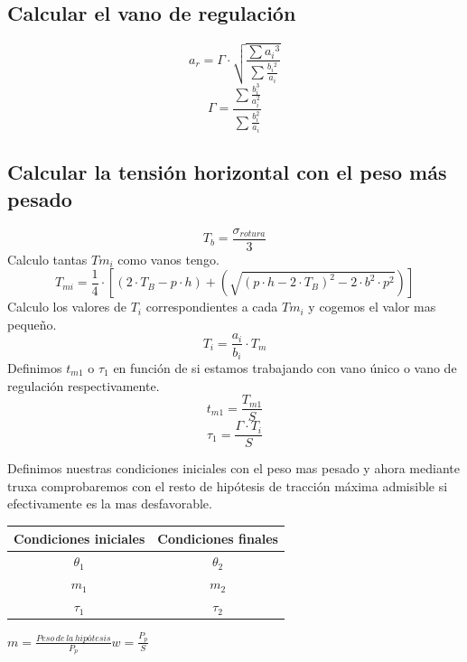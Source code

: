 \documentclass{article}
\begin{document}
\subsection{Calcular el vano de regulación}
$$a_{r}=\Gamma \cdot \sqrt{\frac{\sum a_{i}{ }^{3}}{\sum \frac{b_{i}{ }^{2}}{a_{i}}}}$$
$$\Gamma=\frac{\sum \frac{b_{i}^{3}}{a_{i}^{2}}}{\sum \frac{b_{i}^{2}}{a_{i}}}$$
\newpage
\subsection{Calcular la tensión horizontal con el peso más pesado}
$$T_b = \frac{\sigma_{rotura}}{3}$$
Calculo tantas $Tm_i$ como vanos tengo.
$$T_{m i}=\frac{1}{4} \cdot\left[\left(2 \cdot T_{B}-p \cdot h\right)+\left(\sqrt{\left(p \cdot h-2 \cdot T_{B}\right)^{2}-2 \cdot b^{2} \cdot p^{2}}\right)\right]$$
Calculo los valores de $T_i$ correspondientes a cada $Tm_i$ y cogemos el valor mas pequeño.
$$T_{i}=\frac{a_{i}}{b_{i}} \cdot T_{m}$$
Definimos $t_{m 1}$ o $\tau_1$ en función de si estamos trabajando con vano único o vano de regulación respectivamente.
$$t_{m 1}=\frac{T_{m 1}}{S}$$
$$\tau_{1}=\frac{\Gamma \cdot T_{i}}{S}$$

Definimos nuestras condiciones iniciales con el peso mas pesado y ahora mediante truxa comprobaremos con el resto de hipótesis de tracción máxima admisible si efectivamente es la mas desfavorable.
\begin{center}
\begin{tabular}{| c | c | }
\hline
Condiciones iniciales & Condiciones finales \\ \hline
$\theta_1$ & $\theta_2$  \\\hline
$m_1$ & $m_2$  \\\hline
$\tau_1$ & $\tau_2$ \\\hline
\end{tabular}
\end{center}
$m = \frac{Peso\,de\,la\,hipótesis}{P_p}$\hspace{18 em}$w = \frac{P_p}{S}$
\newpage
\end{document}
